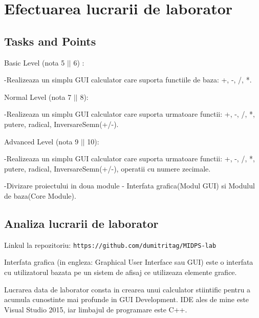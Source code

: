 
\section{Efectuarea lucrarii de laborator}



\subsection{Tasks and Points}



 Basic Level (nota 5 $||$ 6) : 

-Realizeaza un simplu GUI calculator care suporta functiile de baza: +, -, /, *.


Normal Level (nota 7 $||$ 8):
 
-Realizeaza un simplu GUI calculator care suporta urmatoare functii: +, -, /, *, putere, radical, InversareSemn(+/-).


Advanced Level (nota 9 $||$ 10):

-Realizeaza un simplu GUI calculator care suporta urmatoare functii: +, -, /, *, putere, radical, InversareSemn(+/-), operatii cu numere zecimale.

-Divizare proiectului in doua module - Interfata grafica(Modul GUI) si Modulul de baza(Core Module).



\subsection{Analiza lucrarii de laborator}


Linkul la repozitoriu: \texttt{https://github.com/dumitritag/MIDPS-lab}


Interfata grafica (in engleza: Graphical User Interface sau GUI) este o interfata cu utilizatorul bazata pe un sistem de afisaj ce utilizeaza elemente grafice.

Lucrarea data de laborator consta in crearea unui calculator stiintific pentru a acumula cunostinte mai profunde in GUI Development. IDE ales de mine este Visual Studio 2015, iar limbajul de programare este C++.

